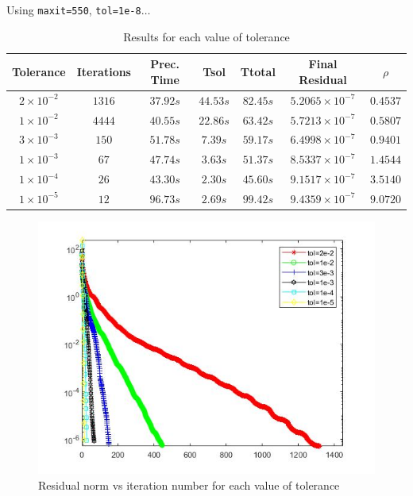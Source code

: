 \documentclass[a4paper, 11pt]{article}
\begin{document}
			Using \texttt{maxit=550}, \texttt{tol=1e-8}$\ldots$
			
			\begin{table}[H]
				\centering
				\begin{tabular}{c|c|c|c|c|c|c}
					\textbf{Tolerance} & \textbf{Iterations} & \textbf{Prec. Time}  & \textbf{Tsol}  & \textbf{Ttotal} & \textbf{Final Residual} & \textbf{$ \rho $} \\ \hline
					$2 \times 10^{-2}$ & $1316$	& $ 37.92 s $ 	& $ 44.53 s $ & $ 82.45 s $ 	& $ 5.2065 \times 10^{-7} $ & $ 0.4537 $\\ \hline
					$1 \times 10^{-2}$ & $4444$	& $ 40.55 s $ 	& $ 22.86 s $ & $ 63.42 s $ 	& $ 5.7213 \times 10^{-7} $ & $ 0.5807 $\\ \hline
					$3 \times 10^{-3}$ & $150$	& $ 51.78 s $ 	& $ 7.39 s $ & $ 59.17 s $ 		& $ 6.4998 \times 10^{-7} $ & $ 0.9401 $\\ \hline
					$1 \times 10^{-3}$ & $67$	& $ 47.74 s $ 	& $ 3.63 s $ & $ 51.37 s $ 		& $ 8.5337 \times 10^{-7} $ & $ 1.4544 $\\ \hline
					$1 \times 10^{-4}$ & $26$	& $ 43.30 s $ 	& $ 2.30 s $ & $ 45.60 s $ 		& $ 9.1517 \times 10^{-7} $ & $ 3.5140 $\\ \hline
					$1 \times 10^{-5}$ & $12$	& $ 96.73 s $ 	& $ 2.69 s $ & $ 99.42 s $ 		& $ 9.4359 \times 10^{-7} $ & $ 9.0720 $\\ \hline
				\end{tabular}
				\caption{Results for each value of tolerance}
				\label{table:ex8}
			\end{table}
			
			\begin{figure}[H]
				\centering
				\includegraphics[width=.6\linewidth]{ex8.jpg}
				\caption{Residual norm vs iteration number for each value of tolerance}
				\label{fig:ex8}
			\end{figure}
	
\end{document}
